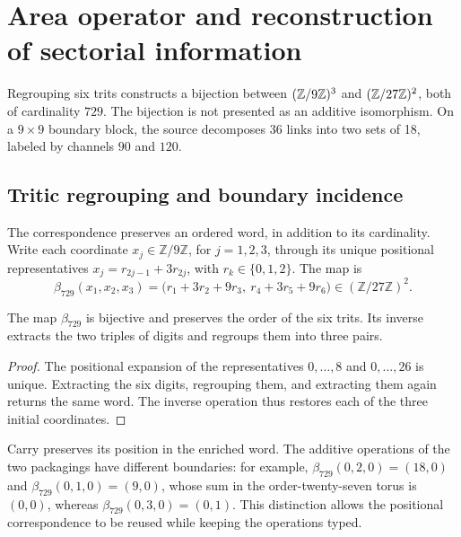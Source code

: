 \section{Area operator and reconstruction of sectorial information}
\label{sec:area}
Regrouping six trits constructs a bijection between
$(\mathbb Z/9\mathbb Z)^3$ and $(\mathbb Z/27\mathbb Z)^2$, both of cardinality $729$.
The bijection is not presented as an additive isomorphism. On a
$9\times9$ boundary block, the source decomposes 36 links into two
sets of 18, labeled by channels $90$ and $120$.

\subsection{Tritic regrouping and boundary incidence}
\label{sec:ii-area-incidencia-explicita}

The correspondence preserves an ordered word, in addition to its cardinality.
Write each coordinate \(x_j\in\mathbb Z/9\mathbb Z\), for
\(j=1,2,3\), through its unique positional representatives
\(x_j=r_{2j-1}+3r_{2j}\), with \(r_k\in\{0,1,2\}\). The map is
\begin{equation}
 \beta_{729}(x_1,x_2,x_3)
 =\bigl(r_1+3r_2+9r_3,\ r_4+3r_5+9r_6\bigr)
 \in(\mathbb Z/27\mathbb Z)^2.
 \label{eq:ii-area-beta729}
\end{equation}

\begin{proposition}
\label{prop:ii-area-beta729}
The map \(\beta_{729}\) is bijective and preserves the order of the
six trits. Its inverse extracts the two triples of digits and regroups them
into three pairs.
\end{proposition}
\begin{proof}
The positional expansion of the representatives \(0,\ldots,8\) and
\(0,\ldots,26\) is unique. Extracting the six digits, regrouping them, and
extracting them again returns the same word. The inverse operation
thus restores each of the three initial coordinates.
\end{proof}

Carry preserves its position in the enriched word. The additive
operations of the two packagings have different boundaries: for example,
\(\beta_{729}(0,2,0)=(18,0)\) and
\(\beta_{729}(0,1,0)=(9,0)\), whose sum in the order-twenty-seven
torus is \((0,0)\), whereas
\(\beta_{729}(0,3,0)=(0,1)\). This distinction allows the positional
correspondence to be reused while keeping the operations typed.

